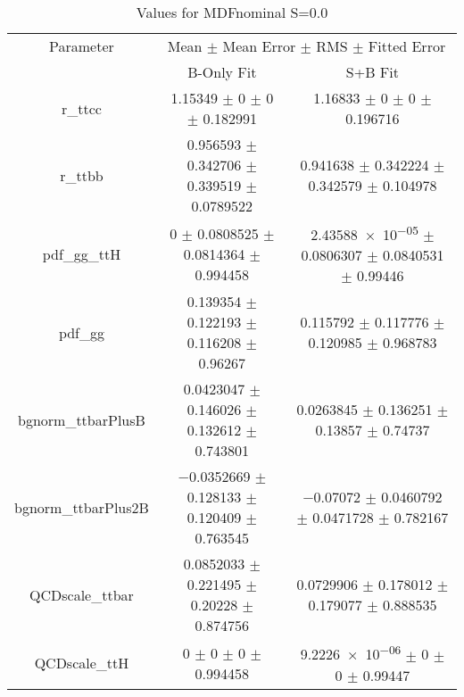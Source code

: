 \begin{table}
\centering
\caption{Values for MDFnominal S=0.0}
\begin{tabular}{ccc}
\toprule
Parameter & \multicolumn{2}{c}{Mean $\pm$ Mean Error $\pm$ RMS $\pm$ Fitted Error}\\
 & B-Only Fit & S+B Fit\\
\midrule
r\_ttcc & \num{1.15349} $\pm$ \num{0} $\pm$ \num{0} $\pm$ \num{0.182991} & \num{1.16833} $\pm$ \num{0} $\pm$ \num{0} $\pm$ \num{0.196716}\\
r\_ttbb & \num{0.956593} $\pm$ \num{0.342706} $\pm$ \num{0.339519} $\pm$ \num{0.0789522} & \num{0.941638} $\pm$ \num{0.342224} $\pm$ \num{0.342579} $\pm$ \num{0.104978}\\
pdf\_gg\_ttH & \num{0} $\pm$ \num{0.0808525} $\pm$ \num{0.0814364} $\pm$ \num{0.994458} & \num{2.43588e-05} $\pm$ \num{0.0806307} $\pm$ \num{0.0840531} $\pm$ \num{0.99446}\\
pdf\_gg & \num{0.139354} $\pm$ \num{0.122193} $\pm$ \num{0.116208} $\pm$ \num{0.96267} & \num{0.115792} $\pm$ \num{0.117776} $\pm$ \num{0.120985} $\pm$ \num{0.968783}\\
bgnorm\_ttbarPlusB & \num{0.0423047} $\pm$ \num{0.146026} $\pm$ \num{0.132612} $\pm$ \num{0.743801} & \num{0.0263845} $\pm$ \num{0.136251} $\pm$ \num{0.13857} $\pm$ \num{0.74737}\\
bgnorm\_ttbarPlus2B & \num{-0.0352669} $\pm$ \num{0.128133} $\pm$ \num{0.120409} $\pm$ \num{0.763545} & \num{-0.07072} $\pm$ \num{0.0460792} $\pm$ \num{0.0471728} $\pm$ \num{0.782167}\\
QCDscale\_ttbar & \num{0.0852033} $\pm$ \num{0.221495} $\pm$ \num{0.20228} $\pm$ \num{0.874756} & \num{0.0729906} $\pm$ \num{0.178012} $\pm$ \num{0.179077} $\pm$ \num{0.888535}\\
QCDscale\_ttH & \num{0} $\pm$ \num{0} $\pm$ \num{0} $\pm$ \num{0.994458} & \num{9.2226e-06} $\pm$ \num{0} $\pm$ \num{0} $\pm$ \num{0.99447}\\
\bottomrule
\end{tabular}
\end{table}
